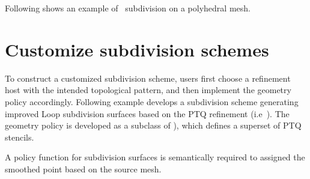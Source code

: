 Following shows an example of \DS\ subdivision on a polyhedral mesh.

\section{Customize subdivision schemes}
To construct a customized subdivision scheme, users first choose a 
refinement host with the intended topological pattern, and then 
implement the geometry policy accordingly. 
Following example develops a subdivision scheme
generating improved Loop subdivision surfaces based on the PTQ 
refinement (i.e~). 
The geometry policy is developed as a subclass 
of ), which defines a superset of PTQ stencils.

A policy function for subdivision surfaces is semantically
required to assigned the smoothed point based on the source mesh.

